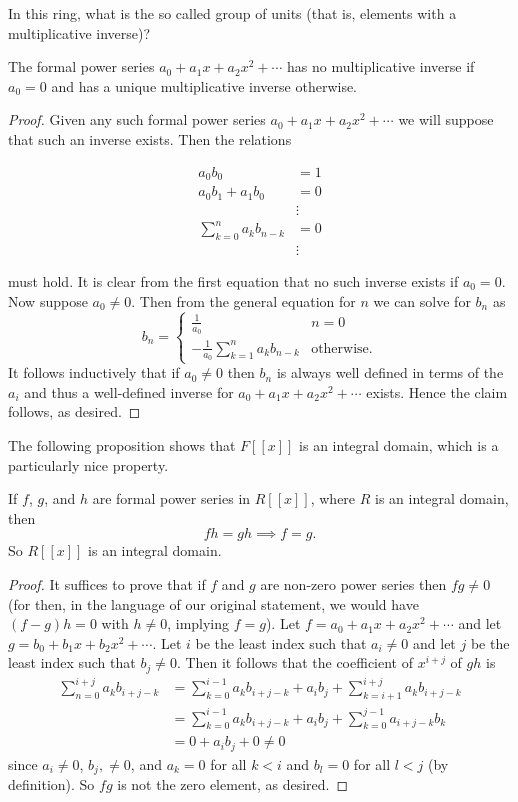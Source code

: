 In this ring, what is the so called group of units (that is, elements with a multiplicative inverse)?
\begin{proposition}
The formal power series $a_0 + a_1x + a_2x^2 + \cdots$ has no multiplicative inverse if $a_0 = 0$ and has a unique multiplicative inverse otherwise.
\end{proposition}
\begin{proof}
Given any such formal power series $a_0 + a_1x + a_2x^2 + \cdots$ we will suppose that such an inverse exists. Then the relations

\begin{align*}
	a_0b_0 &= 1 \\
	a_0b_1 + a_1b_0 &= 0 \\
	&\vdots \\
	\sum_{k = 0}^{n}a_kb_{n-k} &= 0 \\
	&\vdots
\end{align*}

must hold. It is clear from the first equation that no such inverse exists if $a_0 = 0$. Now suppose $a_0 \neq 0$. Then from the general equation for $n$ we can solve for $b_n$ as 
\[b_n = \begin{cases}\frac{1}{a_0} & n = 0 \\ -\frac{1}{a_0}\sum_{k = 1}^na_kb_{n-k} & \text{otherwise.}\end{cases}\]
It follows inductively that if $a_0 \neq 0$ then $b_n$ is always well defined in terms of the $a_i$ and thus a well-defined inverse for $a_0 + a_1x + a_2x^2 + \cdots$ exists. Hence the claim follows, as desired.
\end{proof}

The following proposition shows that $F[[x]]$ is an integral domain, which is a particularly nice property.
\begin{theorem}
If $f$, $g$, and $h$ are formal power series in $R[[x]]$, where $R$ is an integral domain, then 
\[fh = gh \implies f = g.\]
So $R[[x]]$ is an integral domain.
\end{theorem}
\begin{proof}
It suffices to prove that if $f$ and $g$ are non-zero power series then $fg \neq 0$ (for then, in the language of our original statement, we would have $(f-g)h = 0$ with $h \neq 0$, implying $f = g$). Let $f = a_0 + a_1x + a_2x^2 + \cdots$ and let $g = b_0 + b_1x + b_2x^2 + \cdots$. Let $i$ be the least index such that $a_i \neq 0$ and let $j$ be the least index such that $b_j \neq 0$. Then it follows that the coefficient of $x^{i + j}$ of $gh$ is
\begin{align*}
	\sum_{n = 0}^{i + j}a_kb_{i + j - k} &= \sum_{k = 0}^{i - 1}a_kb_{i + j - k} + a_ib_j + \sum_{k = i + 1}^{i + j}a_kb_{i + j - k} \\
	&= \sum_{k = 0}^{i - 1}a_kb_{i + j - k} + a_ib_j + \sum_{k = 0}^{j - 1}a_{i + j - k}b_k \\
&= 0 + a_ib_j + 0 \neq 0
\end{align*}
since $a_i \neq 0$, $b_j, \neq 0$, and $a_k = 0$ for all $k < i$ and $b_l = 0$ for all $l < j$ (by definition). So $fg$ is not the zero element, as desired.
\end{proof}

